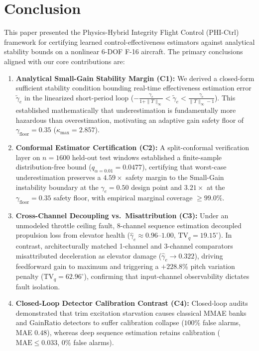 \documentclass[review,12pt]{elsarticle}
\begin{document}
\section{Conclusion}
\label{sec:conclusion}

This paper presented the Physics-Hybrid Integrity Flight Control (PHI-Ctrl) framework for certifying learned control-effectiveness estimators against analytical stability bounds on a nonlinear 6-DOF F-16 aircraft. The primary conclusions aligned with our core contributions are:

\begin{enumerate}
    \item \textbf{Analytical Small-Gain Stability Margin (C1):} We derived a closed-form sufficient stability condition bounding real-time effectiveness estimation error $\tilde{\gamma}_e$ in the linearized short-period loop ($-\frac{\gamma_e}{1+\|T\|_\infty} < \tilde{\gamma}_e < \frac{\gamma_e}{\|T\|_\infty - 1}$). This established mathematically that underestimation is fundamentally more hazardous than overestimation, motivating an adaptive gain safety floor of $\gamma_{\text{floor}} = 0.35$ ($\kappa_{\max} = 2.857$).
    
    \item \textbf{Conformal Estimator Certification (C2):} A split-conformal verification layer on $n = 1600$ held-out test windows established a finite-sample distribution-free bound ($q_{\alpha=0.01} = 0.0477$), certifying that worst-case underestimation preserves a $4.59\times$ safety margin to the Small-Gain instability boundary at the $\gamma_e = 0.50$ design point and $3.21\times$ at the $\gamma_{\text{floor}} = 0.35$ safety floor, with empirical marginal coverage $\ge 99.0\%$.
    
    \item \textbf{Cross-Channel Decoupling vs.\ Misattribution (C3):} Under an unmodeled throttle ceiling fault, 8-channel sequence estimation decoupled propulsion loss from elevator health ($\hat{\gamma}_e \approx 0.96\text{--}1.00$, $\text{TV}_q = 19.15^\circ$). In contrast, architecturally matched 1-channel and 3-channel comparators misattributed deceleration as elevator damage ($\hat{\gamma}_e \to 0.322$), driving feedforward gain to maximum and triggering a $+228.8\%$ pitch variation penalty ($\text{TV}_q = 62.96^\circ$), confirming that input-channel observability dictates fault isolation.
    
    \item \textbf{Closed-Loop Detector Calibration Contrast (C4):} Closed-loop audits demonstrated that trim excitation starvation causes classical MMAE banks and GainRatio detectors to suffer calibration collapse ($100\%$ false alarms, MAE $0.48$), whereas deep sequence estimation retains calibration ($\text{MAE} \le 0.033$, $0\%$ false alarms).
\end{enumerate}
\end{document}
